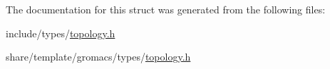 \-The documentation for this struct was generated from the following files\-:\begin{DoxyCompactItemize}
\item 
include/types/\hyperlink{include_2types_2topology_8h}{topology.\-h}\item 
share/template/gromacs/types/\hyperlink{share_2template_2gromacs_2types_2topology_8h}{topology.\-h}\end{DoxyCompactItemize}
